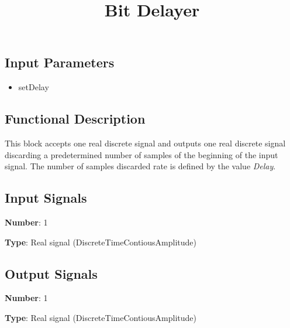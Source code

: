 \documentclass[a4paper]{article}
\title{Bit Delayer}
\begin{document}
\maketitle

\subsection*{Input Parameters}

\begin{multicols}{2}
	\begin{itemize}
		\item setDelay
	\end{itemize}
\end{multicols}

\subsection*{Functional Description}

This block accepts one real discrete signal and outputs one real discrete signal discarding a predetermined number of samples of the beginning of the input signal. The number of samples discarded rate is defined by the value \textit{Delay}.

\subsection*{Input Signals}

\textbf{Number}: 1

\textbf{Type}: Real signal (DiscreteTimeContiousAmplitude)

\subsection*{Output Signals}

\textbf{Number}: 1

\textbf{Type}: Real signal (DiscreteTimeContiousAmplitude)
\end{document}
